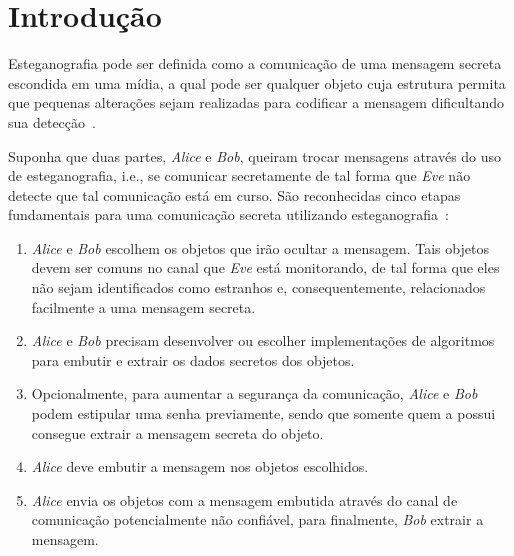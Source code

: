 
\chapter{Introdução}
\label{chap:introducao}


Esteganografia pode ser definida como a comunicação de uma mensagem secreta escondida em uma mídia, a qual pode ser qualquer objeto cuja estrutura permita que pequenas alterações sejam realizadas para codificar a mensagem dificultando sua detecção~\cite{fridrich2009steganography}.

Suponha que duas partes, \textit{Alice} e \textit{Bob}, queiram trocar mensagens através do uso de esteganografia, i.e., se comunicar secretamente de tal forma que \textit{Eve} não detecte que tal comunicação está em curso. São reconhecidas cinco etapas fundamentais para uma comunicação secreta utilizando esteganografia~\cite{fridrich2009steganography}:

\begin{enumerate}
	\item \textit{Alice} e \textit{Bob} escolhem os objetos que irão ocultar a mensagem. Tais objetos devem ser comuns no canal que \textit{Eve} está monitorando, de tal forma que eles não sejam identificados como estranhos e, consequentemente, relacionados facilmente a  uma mensagem secreta.
	\item \textit{Alice} e \textit{Bob} precisam desenvolver ou escolher implementações de algoritmos para embutir e extrair os dados secretos dos objetos.
	\item Opcionalmente, para aumentar a segurança da comunicação, \textit{Alice} e \textit{Bob} podem estipular uma senha previamente, sendo que somente quem a possui consegue extrair a mensagem secreta do objeto.
	\item \textit{Alice} deve embutir a mensagem nos objetos escolhidos.
	\item \textit{Alice} envia os objetos com a mensagem embutida através do canal de comunicação potencialmente não confiável, para finalmente, \textit{Bob} extrair a mensagem.
\end{enumerate}

